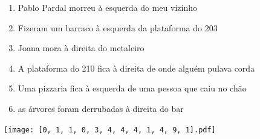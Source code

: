 \documentclass[12pt]{article}
\begin{document}
		 

\pagebreak


	\begin{enumerate}
		  \sffamily %
		  \large %


\vfill \item
Pablo Pardal morreu	%
à esquerda
do meu vizinho	%

\vfill \item
Fizeram um barraco	%
à esquerda
da plataforma do 203	%

\vfill \item
Joana mora	%
à direita
do metaleiro	%

\vfill \item
A plataforma do 210 fica	%
à direita
de onde alguém pulava corda	%

\vfill \item
Uma pizzaria fica	%
à esquerda
de uma pessoa que caiu no chão	%

\vfill \item
as árvores foram derrubadas	%
à direita
do bar	%
	\end{enumerate}
		  
		  \hfill

		  \vfill

\texttt{[image: [0, 1, 1, 0, 3, 4, 4, 4, 1, 4, 9, 1].pdf]}


	\hfill	  	  


\pagebreak			
\end{document}
